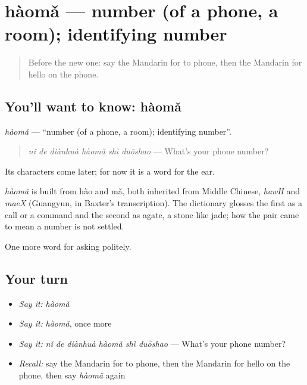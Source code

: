\section[hàomǎ]{hàomǎ — number (of a phone, a room); identifying number}

\label{lesson:ZH-C63-haoma}



\begin{quote}
Before the new one: say the Mandarin for to phone, then the Mandarin for hello on the phone.
\end{quote}

\subsection*{You'll want to know: hàomǎ}
\emph{hàomǎ} — \textquotedblleft{}number (of a phone, a room); identifying number\textquotedblright{}.

\begin{quote}
\emph{nǐ de diànhuà hàomǎ shì duōshao} — What's your phone number?
\end{quote}

Its characters come later; for now it is a word for the ear.

\begin{cousinweb}
\emph{hàomǎ} is built from hào and mǎ, both inherited from Middle Chinese, \emph{hawH} and \emph{maeX} (Guangyun, in Baxter's transcription). The dictionary glosses the first as a call or a command and the second as agate, a stone like jade; how the pair came to mean a number is not settled.
\end{cousinweb}

\begin{grammarlens}[title={What you've built}]
One more word for asking politely.
\end{grammarlens}

\subsection*{Your turn}
\begin{itemize}
\raggedright
  \item \emph{Say it:} \emph{hàomǎ}
  \item \emph{Say it:} \emph{hàomǎ}, once more
  \item \emph{Say it:} \emph{nǐ de diànhuà hàomǎ shì duōshao} — What's your phone number?
  \item \emph{Recall:} say the Mandarin for to phone, then the Mandarin for hello on the phone, then say \emph{hàomǎ} again
\end{itemize}


